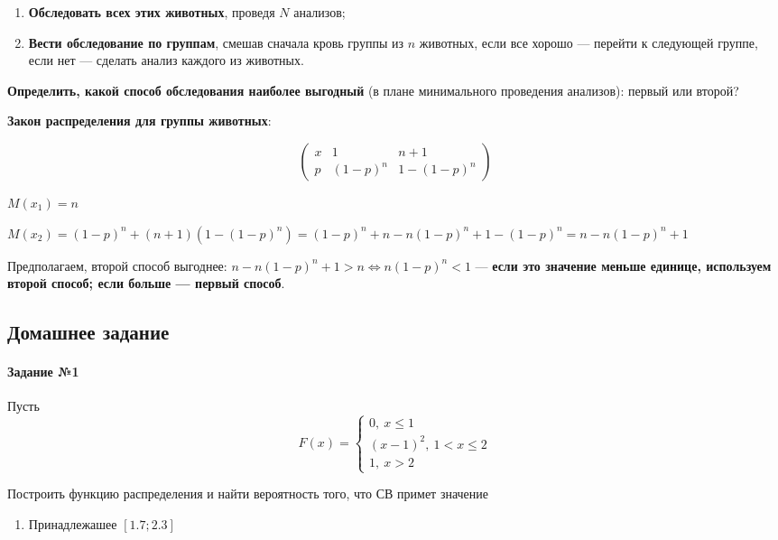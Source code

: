 \documentclass{article}
\begin{document}
\begin{enumerate}
    \item \textbf{Обследовать всех этих животных}, проведя $N$ анализов;
    \item \textbf{Вести обследование по группам}, смешав сначала кровь группы из $n$ животных, если все хорошо — перейти к следующей группе, если нет — сделать анализ каждого из животных.
\end{enumerate}

\textbf{Определить, какой способ обследования наиболее выгодный} (в плане минимального проведения анализов): первый или второй?

\textbf{Закон распределения для группы животных}:

$$
\begin{pmatrix}
    x & 1 & n + 1 \\
    p & (1-p)^{n} & 1 - (1-p)^{n} 
\end{pmatrix}
$$

$M(x_1) = n$

$M(x_2) = (1-p)^{n} + (n + 1)(1 - (1-p)^{n}) = (1-p)^{n} + n - n(1-p)^{n} + 1 - (1-p)^{n} = n - n(1-p)^{n} + 1$

Предполагаем, второй способ выгоднее: $n - n(1-p)^{n} + 1 > n \Longleftrightarrow n(1-p)^{n} < 1$ — \textbf{если это значение меньше единице, используем второй способ; если больше — первый способ}.

\subsection{Домашнее задание}

\paragraph{Задание №1}

Пусть $$F(x) = \begin{cases}
    0, \ x \le 1 \\
    (x - 1)^2, \ 1 < x \le 2 \\
    1, \ x > 2
\end{cases}
$$

Построить функцию распределения и найти вероятность того, что СВ примет значение

\begin{multicols}{2}
    \begin{enumerate}
        \item Принадлежашее $[1.7; 2.3]$
    \end{enumerate}    
\end{multicols}
\end{document}
